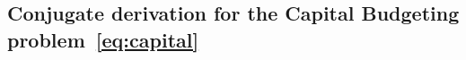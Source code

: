 \documentclass[12pt]{article}
\theoremstyle{thmstyleone}%
\theoremstyle{thmstyletwo}%
\theoremstyle{thmstylethree}%
\newcommand{\reviewChanges}{}
\begin{document}
\begin{appendices}
\ifpreprint
\subsection{Conjugate derivation for the Capital Budgeting problem~\eqref{eq:capital}}
\else

\end{appendices}
\end{document}
